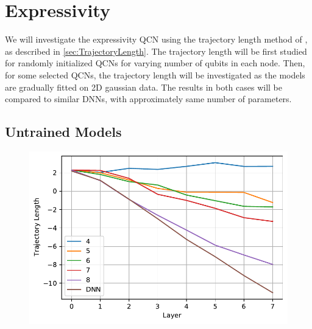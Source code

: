 \section{Expressivity}\label{sec:Expressivity}
We will investigate the expressivity QCN using the trajectory length method of \citet{raghu2017expressive}, as described in \autoref{sec:TrajectoryLength}. The trajectory length will be first studied for randomly initialized QCNs for varying number of qubits in each node. Then, for some selected QCNs, the trajectory length will be investigated as the models are gradually fitted on 2D gaussian data. The results in both cases will be compared to similar DNNs, with approximately same number of parameters. 

\subsection{Untrained Models}\label{sec:Untrained Models}
\begin{figure}[htp]
    \centering
    \includegraphics[width=12cm]{latex/figures/TL_untrained.pdf}
    \caption{}
    \label{fig:QNN_vanishing}
\end{figure}

